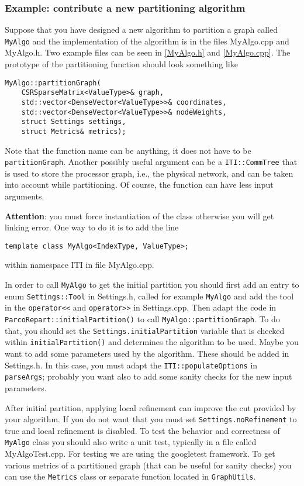 \documentclass[a4paper,10pt]{article}
\newcommand{\att}{\textbf{Attention}: }
\newcommand{\MI}[1]{\texttt{#1}}
\begin{document}
\subsubsection*{Example: contribute a new partitioning algorithm}

Suppose that you have designed a new algorithm to partition a graph called \MI{MyAlgo}
and the implementation of the algorithm is in the files MyAlgo.cpp and MyAlgo.h. Two example files
can be seen in \cref{MyAlgo.h} and \cref{MyAlgo.cpp}.
The prototype of the partitioning function should look something like
\begin{verbatim}
MyAlgo::partitionGraph( 
    CSRSparseMatrix<ValueType>& graph,
    std::vector<DenseVector<ValueType>>& coordinates,
    std::vector<DenseVector<ValueType>>& nodeWeights,
    struct Settings settings,
    struct Metrics& metrics);
\end{verbatim}

Note that the function name can be anything, it does not have to be \MI{partitionGraph}. Another 
possibly useful argument can be a \MI{ITI::CommTree} that is used to store the processor
graph, i.e., the physical network, and can be taken into account while partitioning. Of course,
the function can have less input arguments.


\att you must force instantiation of the class otherwise you will get linking error.
One way to do it is to add the line 
\begin{verbatim}
template class MyAlgo<IndexType, ValueType>;
\end{verbatim}
within namespace ITI in file MyAlgo.cpp.

In order to call \MI{MyAlgo} to get the initial partition you should first add an entry to enum
\MI{Settings::Tool} in Settings.h,
called for example \MI{MyAlgo} and add the tool in the \MI{operator<<} and \MI{operator>>} in
Settings.cpp.
Then adapt the code in \MI{ParcoRepart::initialPartition()} to call \MI{MyAlgo::partitionGraph}. 
To do that, you should set the \MI{Settings.initialPartition}
variable that is checked within \MI{initialPartition()} and determines the algorithm to be used.
Maybe you want to add some parameters used by the algorithm. These should be added in Settings.h.
In this case, you must adapt the \MI{ITI::populateOptions} in \MI{parseArgs}; probably you want also 
to add some sanity checks for the new input parameters.

After initial partition, applying local refinement can improve the cut provided by your algorithm. 
If you do not want that you must set \MI{Settings.noRefinement} to true and local refinement is disabled.
To test the behavior and correctness of \MI{MyAlgo} class you should also write a unit test,
typically in a file called MyAlgoTest.cpp. For testing we are using the googletest framework.
To get various metrics of a partitioned graph (that can be useful for sanity checks) you can
use the \MI{Metrics} class or separate function located in \MI{GraphUtils}.
\end{document}
